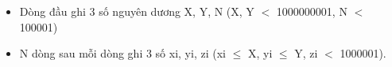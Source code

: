 \begin{itemize}
	\item     Dòng đầu ghi 3 số nguyên dương X, Y, N (X, Y $<$ 1000000001, N $<$ 100001)   
	\item     N dòng sau mỗi dòng ghi 3 số xi, yi, zi (xi  $\le$  X, yi  $\le$  Y, zi $<$ 1000001).   
\end{itemize}

\